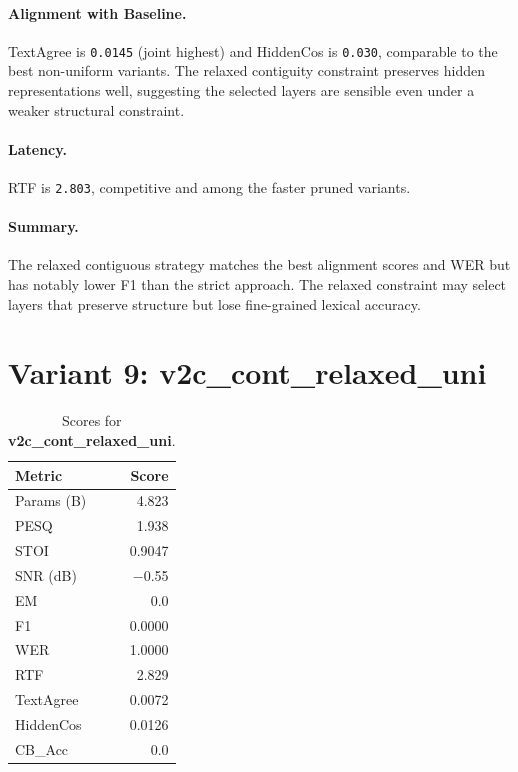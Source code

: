 \documentclass[11pt,a4paper]{article}
\newcommand{\scoreval}[1]{\texttt{#1}}
\begin{document}
\paragraph{Alignment with Baseline.}
TextAgree is \scoreval{0.0145} (joint highest) and HiddenCos is \scoreval{0.030}, comparable to the best non-uniform variants. The relaxed contiguity constraint preserves hidden representations well, suggesting the selected layers are sensible even under a weaker structural constraint.

\paragraph{Latency.}
RTF is \scoreval{2.803}, competitive and among the faster pruned variants.

\paragraph{Summary.}
The relaxed contiguous strategy matches the best alignment scores and WER but has notably lower F1 than the strict approach. The relaxed constraint may select layers that preserve structure but lose fine-grained lexical accuracy.

\newpage
\section{Variant 9: v2c\_cont\_relaxed\_uni}

\begin{table}[H]
\centering
\caption{Scores for \textbf{v2c\_cont\_relaxed\_uni}.}
\begin{tabular}{l r}
\toprule
\textbf{Metric} & \textbf{Score} \\
\midrule
Params (B)    & 4.823 \\
PESQ          & 1.938 \\
STOI          & 0.9047 \\
SNR (dB)      & $-$0.55 \\
EM            & 0.0 \\
F1            & 0.0000 \\
WER           & 1.0000 \\
RTF           & 2.829 \\
TextAgree     & 0.0072 \\
HiddenCos     & 0.0126 \\
CB\_Acc       & 0.0 \\
\bottomrule
\end{tabular}
\end{table}
\end{document}
